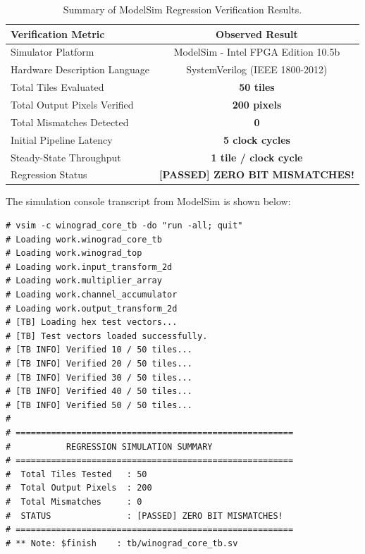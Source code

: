 \documentclass[12pt,a4paper]{article}
\begin{document}
\begin{table}[htbp]
    \centering
    \caption{Summary of ModelSim Regression Verification Results.}
    \label{tab:sim_summary}
    \begin{tabular}{lc}
        \toprule
        \textbf{Verification Metric}                     & \textbf{Observed Result} \\
        \midrule
        Simulator Platform                               & ModelSim - Intel FPGA Edition 10.5b \\
        Hardware Description Language                    & SystemVerilog (IEEE 1800-2012) \\
        Total Tiles Evaluated                            & \textbf{50 tiles} \\
        Total Output Pixels Verified                     & \textbf{200 pixels} \\
        Total Mismatches Detected                        & \textbf{0} \\
        Initial Pipeline Latency                         & \textbf{5 clock cycles} \\
        Steady-State Throughput                          & \textbf{1 tile / clock cycle} \\
        Regression Status                                & \textbf{[PASSED] ZERO BIT MISMATCHES!} \\
        \bottomrule
    \end{tabular}
\end{table}

The simulation console transcript from ModelSim is shown below:
\begin{lstlisting}[caption={ModelSim Automated Regression Simulation Console Transcript.}]
# vsim -c winograd_core_tb -do "run -all; quit" 
# Loading work.winograd_core_tb
# Loading work.winograd_top
# Loading work.input_transform_2d
# Loading work.multiplier_array
# Loading work.channel_accumulator
# Loading work.output_transform_2d
# [TB] Loading hex test vectors...
# [TB] Test vectors loaded successfully.
# [TB INFO] Verified 10 / 50 tiles...
# [TB INFO] Verified 20 / 50 tiles...
# [TB INFO] Verified 30 / 50 tiles...
# [TB INFO] Verified 40 / 50 tiles...
# [TB INFO] Verified 50 / 50 tiles...
# 
# =======================================================
#           REGRESSION SIMULATION SUMMARY                
# =======================================================
#  Total Tiles Tested   : 50
#  Total Output Pixels  : 200
#  Total Mismatches     : 0
#  STATUS               : [PASSED] ZERO BIT MISMATCHES!  
# =======================================================
# ** Note: $finish    : tb/winograd_core_tb.sv
\end{lstlisting}
\end{document}
